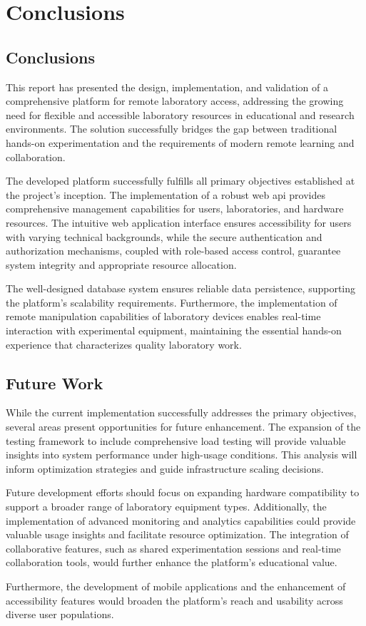 \chapter{Conclusions}
\label{cap:conclusions}

\section{Conclusions}
\label{sec:conclusions}

This report has presented the design, implementation, and validation of a comprehensive platform for remote laboratory access, addressing the growing need for flexible and accessible laboratory resources in educational and research environments. The solution successfully bridges the gap between traditional hands-on experimentation and the requirements of modern remote learning and collaboration.

The developed platform successfully fulfills all primary objectives established at the project's inception. The implementation of a robust web \ac{api} provides comprehensive management capabilities for users, laboratories, and hardware resources. The intuitive web application interface ensures accessibility for users with varying technical backgrounds, while the secure authentication and authorization mechanisms, coupled with role-based access control, guarantee system integrity and appropriate resource allocation.

The well-designed database system ensures reliable data persistence, supporting the platform's scalability requirements. Furthermore, the implementation of remote manipulation capabilities of laboratory devices enables real-time interaction with experimental equipment, maintaining the essential hands-on experience that characterizes quality laboratory work.

\section{Future Work}
\label{sec:future_work}

While the current implementation successfully addresses the primary objectives, several areas present opportunities for future enhancement. The expansion of the testing framework to include comprehensive load testing will provide valuable insights into system performance under high-usage conditions. This analysis will inform optimization strategies and guide infrastructure scaling decisions.

Future development efforts should focus on expanding hardware compatibility to support a broader range of laboratory equipment types. Additionally, the implementation of advanced monitoring and analytics capabilities could provide valuable usage insights and facilitate resource optimization. The integration of collaborative features, such as shared experimentation sessions and real-time collaboration tools, would further enhance the platform's educational value.

Furthermore, the development of mobile applications and the enhancement of accessibility features would broaden the platform's reach and usability across diverse user populations.